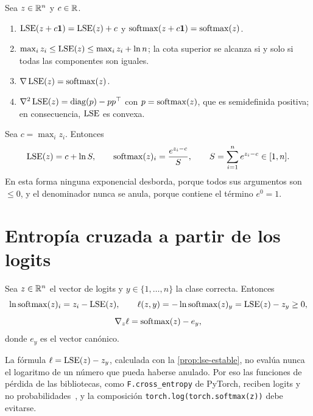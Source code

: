 \begin{proposicion}\label{prop:lse}
Sea $z\in\mathbb{R}^{n}$ y $c\in\mathbb{R}$.
\begin{enumerate}
  \item $\operatorname{LSE}(z+c\mathbf{1})=\operatorname{LSE}(z)+c$ y $\operatorname{softmax}(z+c\mathbf{1})=\operatorname{softmax}(z)$.
  \item $\max_iz_i\le\operatorname{LSE}(z)\le\max_iz_i+\ln n$; la cota superior se alcanza si y solo si todas las componentes son iguales.
  \item $\nabla\operatorname{LSE}(z)=\operatorname{softmax}(z)$.
  \item $\nabla^{2}\operatorname{LSE}(z)=\operatorname{diag}(p)-pp^{\top}$ con $p=\operatorname{softmax}(z)$, que es semidefinida positiva; en consecuencia, $\operatorname{LSE}$ es convexa.
\end{enumerate}
\end{proposicion}

\begin{proposicion}\label{prop:lse-estable}
Sea $c=\max_iz_i$. Entonces
\[
\operatorname{LSE}(z)=c+\ln S,\qquad \operatorname{softmax}(z)_i=\frac{e^{z_i-c}}{S},\qquad S=\sum_{i=1}^{n}e^{z_i-c}\in[1,n].
\]
En esta forma ninguna exponencial desborda, porque todos sus argumentos son $\le 0$, y el denominador nunca se anula, porque contiene el término $e^{0}=1$.
\end{proposicion}

\addtocounter{definicion}{1}%

\section{Entropía cruzada a partir de los logits}

\begin{proposicion}\label{prop:ce}
Sea $z\in\mathbb{R}^{n}$ el vector de logits y $y\in\{1,\dots,n\}$ la clase correcta. Entonces
\[
\ln\operatorname{softmax}(z)_i=z_i-\operatorname{LSE}(z),\qquad \ell(z,y)=-\ln\operatorname{softmax}(z)_y=\operatorname{LSE}(z)-z_y\ge 0,
\]
\[
\nabla_z\ell=\operatorname{softmax}(z)-e_y,
\]
donde $e_y$ es el vector canónico.
\end{proposicion}

La fórmula $\ell=\operatorname{LSE}(z)-z_y$, calculada con la \cref{prop:lse-estable}, no evalúa nunca el logaritmo de un número que pueda haberse anulado. Por eso las funciones de pérdida de las bibliotecas, como \texttt{F.cross\_entropy} de PyTorch, reciben logits y no probabilidades~\cite[§4.5.2]{d2l}, y la composición \texttt{torch.log(torch.softmax(z))} debe evitarse.

\addtocounter{definicion}{1}%

